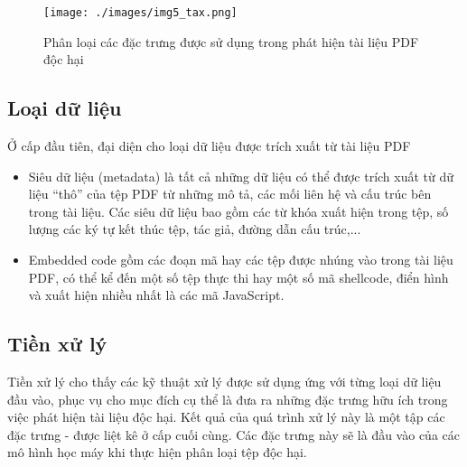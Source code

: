 \documentclass[./../main.tex]{subfiles}
\begin{document}
\begin{figure}[ht!]
	\centering
	\texttt{[image: ./images/img5\_tax.png]}
	\caption{Phân loại các đặc trưng được sử dụng trong phát hiện tài liệu PDF độc hại}
	\label{fig:img5_tax}
\end{figure}


\subsection*{Loại dữ liệu}
Ở cấp đầu tiên, đại diện cho loại dữ liệu được trích xuất từ tài liệu PDF

\begin{itemize}
	\item Siêu dữ liệu (metadata) là tất cả những dữ liệu có thể được trích xuất từ dữ liệu “thô” của tệp PDF từ những mô tả, các mối liên hệ và cấu trúc bên trong tài liệu. Các siêu dữ liệu bao gồm các từ khóa xuất hiện trong tệp, số lượng các ký tự kết thúc tệp, tác giả, đường dẫn cấu trúc,...
	\item Embedded code gồm các đoạn mã hay các tệp được nhúng vào trong tài liệu PDF, có thể kể đến một số tệp thực thi hay một số mã shellcode, điển hình và xuất hiện nhiều nhất là các mã JavaScript.
\end{itemize}


\subsection*{Tiền xử lý}
Tiền xử lý cho thấy các kỹ thuật xử lý được sử dụng ứng với từng loại dữ liệu đầu vào, phục vụ cho mục đích cụ thể là đưa ra những đặc trưng hữu ích trong việc phát hiện tài liệu độc hại. Kết quả của quá trình xử lý này là một tập các đặc trưng - được liệt kê ở cấp cuối cùng. Các đặc trưng này sẽ là đầu vào của các mô hình học máy khi thực hiện phân loại tệp độc hại.
\end{document}
